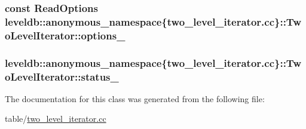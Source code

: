\subsubsection[{options\+\_\+}]{\setlength{\rightskip}{0pt plus 5cm}const {\bf Read\+Options} leveldb\+::anonymous\+\_\+namespace\{two\+\_\+level\+\_\+iterator.\+cc\}\+::Two\+Level\+Iterator\+::options\+\_\+\hspace{0.3cm}{\ttfamily [private]}}\label{classleveldb_1_1anonymous__namespace_02two__level__iterator_8cc_03_1_1_two_level_iterator_a59942395b26630f9b6cc6aa86873532a}
\hypertarget{classleveldb_1_1anonymous__namespace_02two__level__iterator_8cc_03_1_1_two_level_iterator_a5a6d562429311dc21c5ad6e9c5988508}{}
\subsubsection[{status\+\_\+}]{ leveldb\+::anonymous\+\_\+namespace\{two\+\_\+level\+\_\+iterator.\+cc\}\+::Two\+Level\+Iterator\+::status\+\_\+\hspace{0.3cm}{\ttfamily [private]}}\label{classleveldb_1_1anonymous__namespace_02two__level__iterator_8cc_03_1_1_two_level_iterator_a5a6d562429311dc21c5ad6e9c5988508}


The documentation for this class was generated from the following file\+:\begin{DoxyCompactItemize}
\item 
table/\hyperlink{two__level__iterator_8cc}{two\+\_\+level\+\_\+iterator.\+cc}\end{DoxyCompactItemize}
